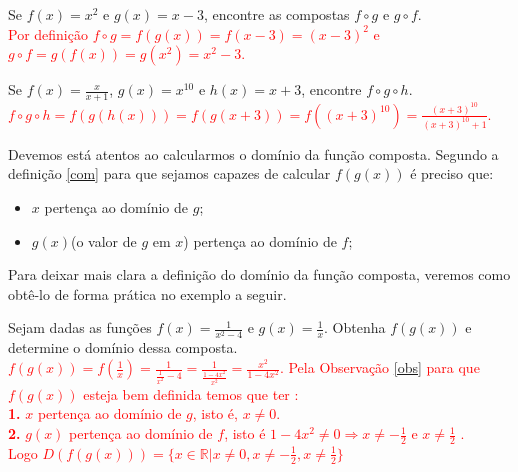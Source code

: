\begin{exe} Se $f(x)= x^2$ e $g(x)=x-3$, encontre as compostas $f \circ g$ e $g \circ f$. \\
\textcolor{red}{Por definição $f \circ g= f(g(x))=f(x-3)=(x-3)^2$ e $g \circ f= g(f(x))=g(x^2)= x^2-3$.}
\end{exe}
\begin{exe} Se $f(x)= \frac{x}{x+1}$, $g(x)=x^{10}$ e $h(x)=x+3$, encontre  $f \circ g \circ h$. \\
\textcolor{red}{$f \circ g \circ h= f(g(h(x)))= f(g(x+3))=f((x+3)^{10})=\frac{(x+3)^{10}}{(x+3)^{10}+1}$.}
\end{exe}
\begin{obs} \label{obs} Devemos está atentos ao calcularmos o domínio da função composta. Segundo a definição \ref{com} para que sejamos capazes de calcular $f(g(x))$ é preciso que:
\begin{itemize}
\item[1.] $x$ pertença ao domínio de $g$;
\item[2.] $g(x)$(o valor de $g$ em $x$) pertença ao domínio de $f$;
\end{itemize}
Para deixar mais clara a definição do domínio da função composta, veremos como obtê-lo de forma prática no exemplo a seguir.
\end{obs}
\begin{exe}
Sejam dadas as funções $f(x)=\frac{1}{x^2-4}$ e $g(x)=\frac{1}{x}$. Obtenha $f(g(x))$ e determine o domínio dessa composta. \\
\textcolor{red}{$f(g(x))= f(\frac{1}{x})=\frac{1}{\frac{1}{x^2}-4}= \frac{1}{\frac{1-4x^2}{x^2}}= \frac{x^2}{1-4x^2}$. Pela Observação  \ref{obs} para que $f(g(x))$ esteja bem definida temos que ter : \\
\textbf{1.} $x$ pertença ao domínio de $g$, isto é, $x \neq 0$. \\
\textbf{2.} $g(x)$ pertença ao domínio de $f$, isto é $1-4x^2 \neq 0 \Rightarrow x \neq -\frac{1}{2}$ e $x \neq \frac{1}{2}$ . \\
Logo  $D(f(g(x)))= \{ x \in \mathbb{R} | x \neq 0, x \neq -\frac{1}{2}, x \neq \frac{1}{2}\}$}
\end{exe}

